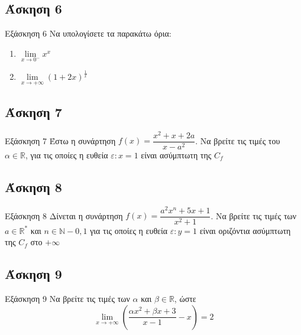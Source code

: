 \documentclass[greek]{beamer}
\begin{document}
\subsection{Άσκηση 6}
\begin{frame}[label=Άσκηση6,t]{Εξάσκηση 6}
    Να υπολογίσετε τα παρακάτω όρια:
    \begin{enumerate}
        \item<1-> $\lim\limits_{x \to 0^-}{ x^x }$
        \item<2-> $\lim\limits_{x \to +\infty}{ \left( 1+2x \right)^{\frac{1}{x}}  }$
    \end{enumerate}

\end{frame}

\subsection{Άσκηση 7}
\begin{frame}[label=Άσκηση7,t]{Εξάσκηση 7}
    Έστω η συνάρτηση $f(x)=\dfrac{x^2+x+2a}{x-a^2}$. Να βρείτε τις τιμές του $α\in\mathbb{R}$, για τις οποίες η ευθεία $ε:x=1$ είναι ασύμπτωτη της $C_f$

\end{frame}

\subsection{Άσκηση 8}
\begin{frame}[label=Άσκηση8,t]{Εξάσκηση 8}
    Δίνεται η συνάρτηση $f(x)=\dfrac{a^2x^n+5x+1}{x^2+1}$. Να βρείτε τις τιμές των $a\in\mathbb{R}^*$ και $n\in\mathbb{N}-{0,1}$ για τις οποίες η ευθεία $ε:y=1$ είναι οριζόντια ασύμπτωτη της $C_f$ στο $+\infty$

\end{frame}

\subsection{Άσκηση 9}
\begin{frame}[label=Άσκηση9,t]{Εξάσκηση 9}
    Να βρείτε τις τιμές των $α$ και $β\in\mathbb{R}$, ώστε
    $$\lim\limits_{x \to +\infty}{ \left(   \dfrac{αx^2+βx+3}{x-1}-x \right)}=2$$

\end{frame}
\end{document}
